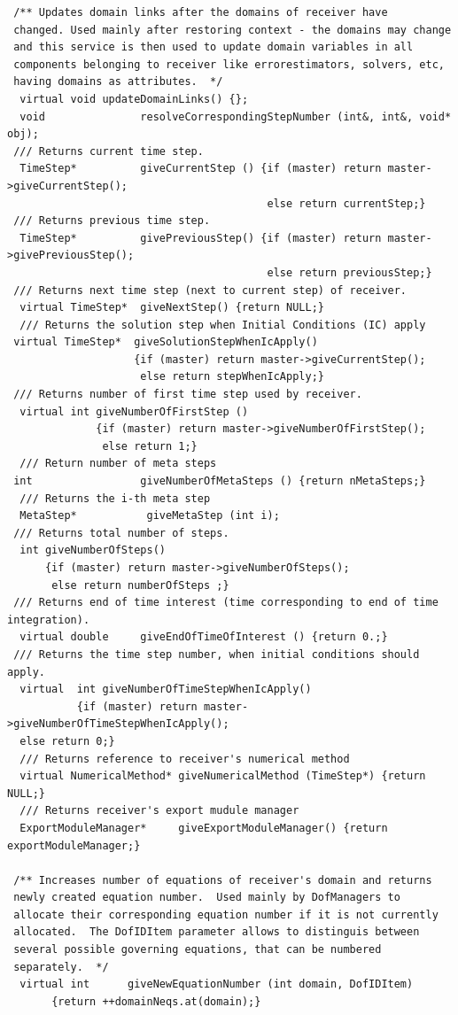 \documentclass[a4paper]{article}
\begin{document}
{\begin{verbatim}
 /** Updates domain links after the domains of receiver have
 changed. Used mainly after restoring context - the domains may change
 and this service is then used to update domain variables in all
 components belonging to receiver like errorestimators, solvers, etc,
 having domains as attributes.  */
  virtual void updateDomainLinks() {};
  void               resolveCorrespondingStepNumber (int&, int&, void* obj);
 /// Returns current time step.
  TimeStep*          giveCurrentStep () {if (master) return master->giveCurrentStep(); 
                                         else return currentStep;}
 /// Returns previous time step.
  TimeStep*          givePreviousStep() {if (master) return master->givePreviousStep(); 
                                         else return previousStep;}
 /// Returns next time step (next to current step) of receiver.
  virtual TimeStep*  giveNextStep() {return NULL;}
  /// Returns the solution step when Initial Conditions (IC) apply
 virtual TimeStep*  giveSolutionStepWhenIcApply() 
                    {if (master) return master->giveCurrentStep(); 
                     else return stepWhenIcApply;}
 /// Returns number of first time step used by receiver.
  virtual int giveNumberOfFirstStep () 
              {if (master) return master->giveNumberOfFirstStep();
               else return 1;}
  /// Return number of meta steps
 int                 giveNumberOfMetaSteps () {return nMetaSteps;}
  /// Returns the i-th meta step
  MetaStep*           giveMetaStep (int i);
 /// Returns total number of steps.
  int giveNumberOfSteps() 
      {if (master) return master->giveNumberOfSteps(); 
       else return numberOfSteps ;}
 /// Returns end of time interest (time corresponding to end of time integration).
  virtual double     giveEndOfTimeOfInterest () {return 0.;}
 /// Returns the time step number, when initial conditions should apply.
  virtual  int giveNumberOfTimeStepWhenIcApply() 
           {if (master) return master->giveNumberOfTimeStepWhenIcApply(); 
  else return 0;}
  /// Returns reference to receiver's numerical method
  virtual NumericalMethod* giveNumericalMethod (TimeStep*) {return NULL;}
  /// Returns receiver's export mudule manager
  ExportModuleManager*     giveExportModuleManager() {return exportModuleManager;}

 /** Increases number of equations of receiver's domain and returns
 newly created equation number.  Used mainly by DofManagers to
 allocate their corresponding equation number if it is not currently
 allocated.  The DofIDItem parameter allows to distinguis between
 several possible governing equations, that can be numbered
 separately.  */
  virtual int      giveNewEquationNumber (int domain, DofIDItem) 
       {return ++domainNeqs.at(domain);}


\end{verbatim}}
\end{document}
